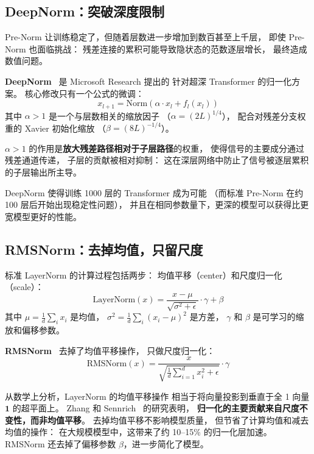 \subsection{DeepNorm：突破深度限制}

Pre-Norm 让训练稳定了，但随着层数进一步增加到数百甚至上千层，
即使 Pre-Norm 也面临挑战：
残差连接的累积可能导致隐状态的范数逐层增长，
最终造成数值问题。

\textbf{DeepNorm}~\cite{wang2022deepnet} 是 Microsoft Research 提出的
针对超深 Transformer 的归一化方案。
核心修改只有一个公式的微调：
\[
  x_{l+1} = \mathrm{Norm}(\alpha \cdot x_l + f_l(x_l))
\]
其中 $\alpha > 1$ 是一个与层数相关的缩放因子
（$\alpha = (2L)^{1/4}$），
配合对残差分支权重的 Xavier 初始化缩放
（$\beta = (8L)^{-1/4}$）。

$\alpha > 1$ 的作用是\textbf{放大残差路径相对于子层路径}的权重，
使得信号的主要成分通过残差通道传递，
子层的贡献被相对抑制：
这在深层网络中防止了信号被逐层累积的子层输出所主导。

DeepNorm 使得训练 1000 层的 Transformer 成为可能
（而标准 Pre-Norm 在约 100 层后开始出现稳定性问题），
并且在相同参数量下，更深的模型可以获得比更宽模型更好的性能。

\subsection{RMSNorm：去掉均值，只留尺度}

标准 LayerNorm 的计算过程包括两步：
均值平移（center）和尺度归一化（scale）：
\begin{equation}
  \mathrm{LayerNorm}(x) = \frac{x - \mu}{\sqrt{\sigma^2 + \epsilon}} \cdot \gamma + \beta
\end{equation}
其中 $\mu = \frac{1}{d}\sum_{i} x_i$ 是均值，
$\sigma^2 = \frac{1}{d}\sum_{i}(x_i - \mu)^2$ 是方差，
$\gamma$ 和 $\beta$ 是可学习的缩放和偏移参数。

\textbf{RMSNorm}~\cite{zhang2019rms} 去掉了均值平移操作，
只做尺度归一化：
\begin{equation}
  \mathrm{RMSNorm}(x) = \frac{x}{\sqrt{\frac{1}{d}\sum_{i=1}^{d} x_i^2 + \epsilon}} \cdot \gamma
\end{equation}

从数学上分析，LayerNorm 的均值平移操作
相当于将向量投影到垂直于全 1 向量 $\mathbf{1}$ 的超平面上。
Zhang 和 Sennrich~\cite{zhang2019rms} 的研究表明，
\textbf{归一化的主要贡献来自尺度不变性，而非均值平移}。
去掉均值平移不影响模型质量，
但节省了计算均值和减去均值的操作：
在大规模模型中，这带来了约 10--15\% 的归一化层加速。
RMSNorm 还去掉了偏移参数 $\beta$，进一步简化了模型。

